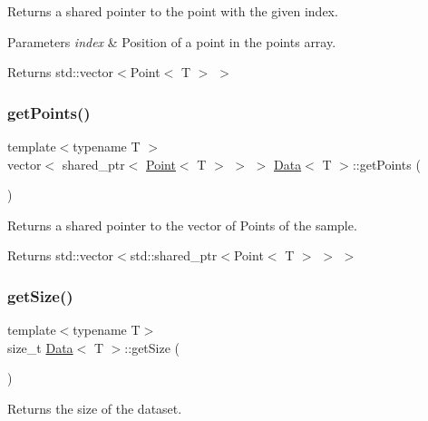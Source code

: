 Returns a shared pointer to the point with the given index. 


\begin{DoxyParams}{Parameters}
{\em index} & Position of a point in the points array. \\
\hline
\end{DoxyParams}
\begin{DoxyReturn}{Returns}
std\+::vector$<$Point$<$ T $>$ $>$ 
\end{DoxyReturn}
\mbox{\label{class_data_a63a36fcbe42e0956d602f11af0d2009e}} 
\subsubsection{\texorpdfstring{get\+Points()}{getPoints()}}
{\footnotesize\ttfamily template$<$typename T $>$ \\
vector$<$ shared\+\_\+ptr$<$ \mbox{\hyperlink{class_point}{Point}}$<$ T $>$ $>$ $>$ \mbox{\hyperlink{class_data}{Data}}$<$ T $>$\+::get\+Points (\begin{DoxyParamCaption}{ }\end{DoxyParamCaption})}



Returns a shared pointer to the vector of Points of the sample. 

\begin{DoxyReturn}{Returns}
std\+::vector$<$std\+::shared\+\_\+ptr$<$Point$<$ T $>$ $>$ $>$ 
\end{DoxyReturn}
\mbox{\label{class_data_a310d4da4294cb3576a2faf0809c91b1e}} 
\subsubsection{\texorpdfstring{get\+Size()}{getSize()}}
{\footnotesize\ttfamily template$<$typename T$>$ \\
size\+\_\+t \mbox{\hyperlink{class_data}{Data}}$<$ T $>$\+::get\+Size (\begin{DoxyParamCaption}{ }\end{DoxyParamCaption})\hspace{0.3cm}{\ttfamily [inline]}}



Returns the size of the dataset. 

